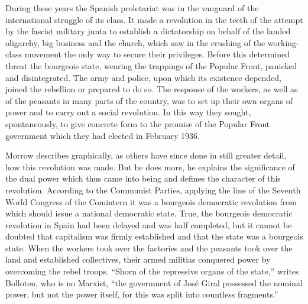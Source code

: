 During these years the Spanish proletariat was in the vanguard of the international struggle of its class. It made a revolution in the teeth of the attempt by the fascist military junta to establish a dictatorship on behalf of the landed oligarchy, big business and the church, which saw in the crushing of the working-class movement the only way to secure their privileges. Before this determined threat the bourgeois state, wearing the trappings of the Popular Front, panicked and disintegrated. The army and police, upon which its existence depended, joined the rebellion or prepared to do so. The response of the workers, as well as of the peasants in many parts of the country, was to set up their own organs of power and to carry out a social revolution. In this way they sought, spontaneously, to give concrete form to the promise of the Popular Front government which they had elected in February 1936.

Morrow describes graphically, as others have since done in still greater detail, how this revolution was made. But he does more, he explains the significance of the dual power which thus came into being and defines the character of this revolution. According to the Communist Parties, applying the line of the Seventh World Congress of the Comintern\label{en:BollotenGrandCamouflageP42} it was a bourgeois democratic revolution from which should issue a national democratic state. True, the bourgeois democratic revolution in Spain had been delayed and was half completed, but it cannot be doubted that capitalism was firmly established and that the state was a bourgeois state. When the workers took over the factories and the peasants took over the land and established collectives, their armed militias conquered power by overcoming the rebel troops. ``Shorn of the repressive organs of the state,'' writes Bolloten{\indexBBolloten}, who is no Marxist, ``the government of Jos\'e Giral{\indexJGiral} possessed the nominal power, but not the power itself, for this was split into countless fragments.''\endnotemark[\ref{en:BollotenGrandCamouflageP42}]

